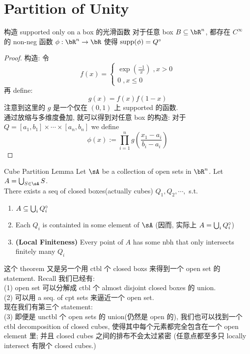 \documentclass[lang=cn,11pt]{elegantbook}
\begin{document}
\section{Partition of Unity}

\begin{lemma}{构造 supported only on a box 的光滑函数}
    对于任意 box $B \sub \bR^n$, 都存在 $C^{\infty}$ 的 non-neg 函数 $\phi: \bR^n \rar \bR$ 使得 $\operatorname{supp}(\phi) = Q^{\circ}$
\end{lemma}
\begin{proof}
    构造:
    令
    $$
    f(x) = 
    \begin{cases}
    \exp(\frac{-1}{x}) \; , x >0 \\
    0 \; , x \leq 0
    \end{cases}
    $$
    再 define:
    $$
    g(x) = f(x)f(1-x)
    $$
    注意到这里的 $g$ 是一个仅在 $(0,1)$ 上 supported 的函数.\\
    通过放缩与多维度叠加, 就可以得到对任意 box 的构造:
    对于 $Q = [a_1, b_1] \times \cdots \times [a_n, b_n]$ we define
    $$
    \phi(x) := \prod_{i = 1}^n g(\frac{x_1 - a_i}{b_i - a_i})
    $$
\end{proof}




\begin{lemma}{Cube Partition Lemma}
Let $\sA$ be a collection of open sets in $\bR^n$. Let $A  = \union_{S \in \sA} S$.\\
There exists a seq of closed boxes(actually cubes) $Q_1, Q_2, \cdots, $ s.t.
\begin{enumerate}
    \item $A \subseteq \bigcup_{i} Q_i ^{\circ}$
    \item Each $Q_i$ is containted in some element of $\sA$ (因而, 实际上 $A  = \bigcup_{i} Q_i ^{\circ}$)
    \item \textbf{(Local Finiteness)} Every point of $A$ has some nbh that only intersects finitely many $Q_i$
\end{enumerate}
\end{lemma}
\begin{remark}
这个 theorem 又是另一个用 ctbl 个 closed boxs 来得到一个 open set 的 statement. Recall 我们已经有:\\
(1) open set 可以分解成 ctbl 个 almost disjoint closed boxes 的 union.\\
(2) 可以用 a seq. of cpt sets 来逼近一个 open set.\\
现在我们有第三个 statement:\\
(3) 即便是 unctbl 个 open sets 的 union(仍然是 open 的), 我们也可以找到一个 ctbl decomposition of closed cubes, 使得其中每个元素都完全包含在一个 open element 里; 并且 closed cubes 之间的排布不会太过紧密 (任意点都至多只 locally intersect 有限个 closed cubes.)\\
\end{remark}
\end{document}
